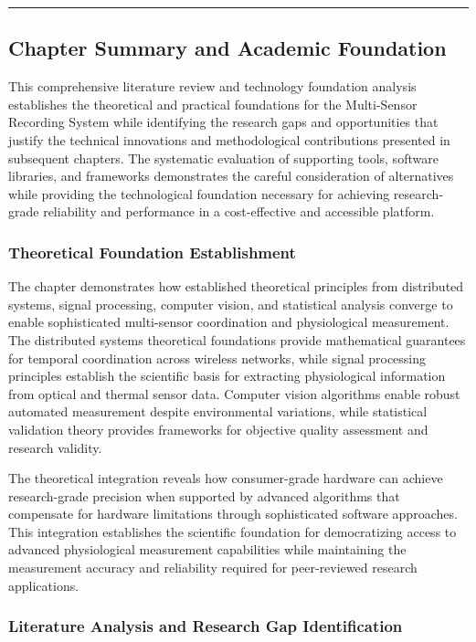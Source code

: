 \documentclass[12pt,a4paper]{report}
\begin{document}
\hrule

\subsection{Chapter Summary and Academic Foundation}

This comprehensive literature review and technology foundation analysis establishes the theoretical and practical
foundations for the Multi-Sensor Recording System while identifying the research gaps and opportunities that justify the
technical innovations and methodological contributions presented in subsequent chapters. The systematic evaluation of
supporting tools, software libraries, and frameworks demonstrates the careful consideration of alternatives while
providing the technological foundation necessary for achieving research-grade reliability and performance in a
cost-effective and accessible platform.

\subsubsection{Theoretical Foundation Establishment}

The chapter demonstrates how established theoretical principles from distributed systems, signal processing, computer
vision, and statistical analysis converge to enable sophisticated multi-sensor coordination and physiological
measurement. The distributed systems theoretical foundations provide mathematical guarantees for temporal coordination
across wireless networks, while signal processing principles establish the scientific basis for extracting physiological
information from optical and thermal sensor data. Computer vision algorithms enable robust automated measurement despite
environmental variations, while statistical validation theory provides frameworks for objective quality assessment and
research validity.

The theoretical integration reveals how consumer-grade hardware can achieve research-grade precision when supported by
advanced algorithms that compensate for hardware limitations through sophisticated software approaches. This integration
establishes the scientific foundation for democratizing access to advanced physiological measurement capabilities while
maintaining the measurement accuracy and reliability required for peer-reviewed research applications.

\subsubsection{Literature Analysis and Research Gap Identification}
\end{document}

